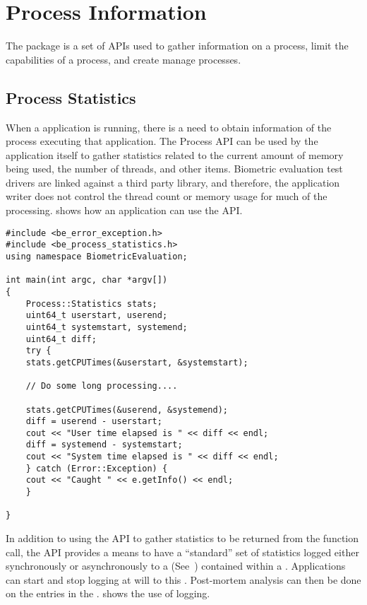 %
%
\chapter{Process Information}
\label{chp-process}

The  package is a set of APIs used to gather information on a process,
limit the capabilities of a process, and create manage processes.

\section{Process Statistics}
\label{sec-process_statistics}

When a application is running, there is a need to obtain information of the
process executing that application. The Process API can be used by the
application itself to gather statistics related to the current amount of memory
being used, the number of threads, and other items. Biometric evaluation test
drivers are linked against a third party library, and therefore, the application
writer does not control the thread count or memory usage for much of the
processing.  shows how an application can
use the  API.

\begin{lstlisting}[caption={Gathering Process Statistics}, label=lst:processstatisticsuse]
#include <be_error_exception.h>
#include <be_process_statistics.h>
using namespace BiometricEvaluation;

int main(int argc, char *argv[])
{
    Process::Statistics stats;
    uint64_t userstart, userend;
    uint64_t systemstart, systemend;
    uint64_t diff;
    try {
	stats.getCPUTimes(&userstart, &systemstart);

	// Do some long processing....

	stats.getCPUTimes(&userend, &systemend);
	diff = userend - userstart;
	cout << "User time elapsed is " << diff << endl;
	diff = systemend - systemstart;
	cout << "System time elapsed is " << diff << endl;
    } catch (Error::Exception) {
	cout << "Caught " << e.getInfo() << endl;
    }

}
\end{lstlisting}

In addition to using the  API to gather statistics to be returned from
the function call, the API provides a means to have a ``standard'' set of
statistics logged either synchronously or asynchronously to a 
 (See~) contained within a .
Applications can
start and stop logging at will to this . Post-mortem analysis can
then be done on the entries in the .
 shows the use of logging.

